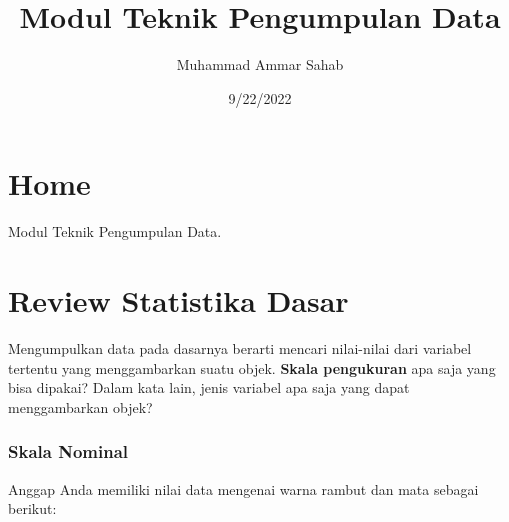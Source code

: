 \documentclass[
  letterpaper,
  DIV=11,
  numbers=noendperiod]{scrreprt}
\title{Modul Teknik Pengumpulan Data}
\author{Muhammad Ammar Sahab}
\date{9/22/2022}
\renewcommand*\contentsname{Table of contents}
\newcommand\contentsname{Table of contents}
\begin{document}
\maketitle
\ifdefined\Shaded\renewenvironment{Shaded}{\begin{tcolorbox}[boxrule=0pt, frame hidden, borderline west={3pt}{0pt}{shadecolor}, interior hidden, enhanced, breakable, sharp corners]}{\end{tcolorbox}}\fi

\renewcommand*\contentsname{Table of contents}
{
\hypersetup{linkcolor=}
\setcounter{tocdepth}{2}
\tableofcontents
}

\hypertarget{home}{%
\chapter*{Home}\label{home}}

Modul Teknik Pengumpulan Data.


\hypertarget{review-statistika-dasar}{%
\chapter{Review Statistika Dasar}\label{review-statistika-dasar}}

Mengumpulkan data pada dasarnya berarti mencari nilai-nilai dari
variabel tertentu yang menggambarkan suatu objek. \textbf{Skala
pengukuran} apa saja yang bisa dipakai? Dalam kata lain, jenis variabel
apa saja yang dapat menggambarkan objek?

\hypertarget{skala-nominal}{%
\subsection{Skala Nominal}\label{skala-nominal}}

Anggap Anda memiliki nilai data mengenai warna rambut dan mata sebagai
berikut:
\end{document}
